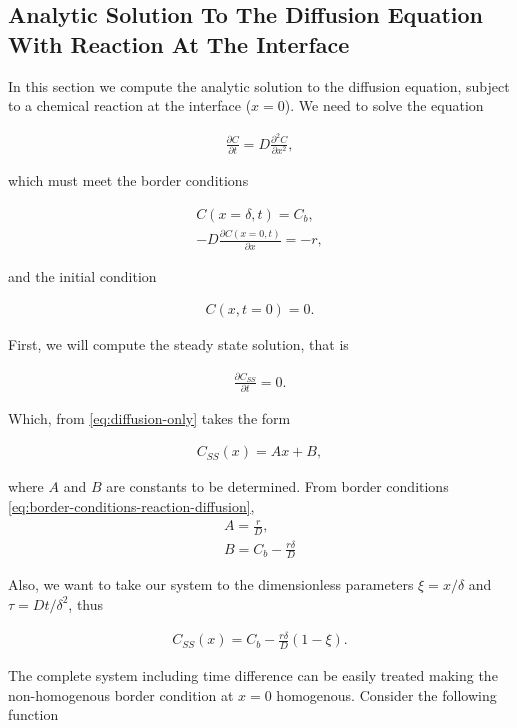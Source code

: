 \subsection{Analytic Solution To The Diffusion Equation With Reaction At The Interface}
\label{sec:analytic-diffusion-reaction}

In this section we compute the analytic solution to the diffusion equation, subject to a chemical reaction at the interface ($x = 0$).
We need to solve the equation

\begin{align}
	\frac{\partial C}{\partial t} = D\frac{\partial^2 C}{\partial x^2},
\end{align}

which must meet the border conditions

\begin{align}
	C(x = \delta, t) = C_b,\\
	-D\frac{\partial C(x = 0, t)}{\partial x} = -r,
\end{align}

and the initial condition

\begin{align}
	C(x, t = 0) = 0.
\end{align}

First, we will compute the steady state solution, that is

\begin{align}
	\frac{\partial C_{SS}}{\partial t} = 0.
\end{align}

Which, from \ref{eq:diffusion-only} takes the form

\begin{align}
	C_{SS}(x) = Ax+B,
\end{align}

where $A$ and $B$ are constants to be determined. From border conditions \ref{eq:border-conditions-reaction-diffusion},
\begin{align}
	A = \frac{r}{D},\\
	B = C_b - \frac{r\delta}{D}
\end{align}

Also, we want to take our system to the dimensionless parameters $\xi = x/\delta$ and $\tau = D t / \delta^2$, thus

\begin{align}
	C_{SS}(x) = C_b - \frac{r\delta}{D}(1-\xi).
\end{align}

The complete system including time difference can be easily treated making the non-homogenous border condition at $x=0$ homogenous. Consider the following function

